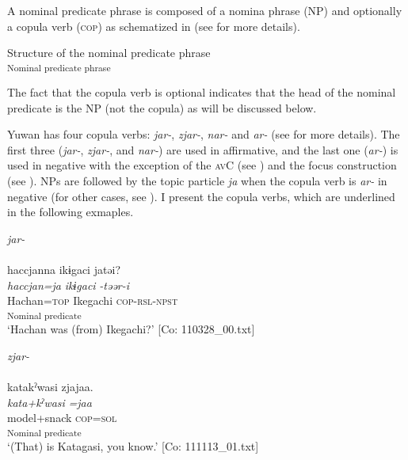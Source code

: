 A nominal predicate phrase is composed of a nomina phrase (NP) and optionally a copula verb (\textsc{cop}) as schematized in  (see  for more details).

\ea  Structure of the nominal predicate phrase \label{ex:4.12}\\\textsubscript{Nominal predicate phrase}
\z

The fact that the copula verb is optional indicates that the head of the nominal predicate is the NP (not the copula) as will be discussed below.

Yuwan has four copula verbs: \textit{jar-}, \textit{zjar-}, \textit{nar-} and \textit{ar-} (see  for more details). The first three (\textit{jar-}, \textit{zjar-}, and \textit{nar-}) are used in affirmative, and the last one (\textit{ar-}) is used in negative with the exception of the \textsc{av}C (see ) and the focus construction (see ). NPs are followed by the topic particle \textit{ja} when the copula verb is \textit{ar-} in negative (for other cases, see ). I present the copula verbs, which are underlined in the following exmaples.

\ea \label{ex:4.13}
\ea   \textit{jar-} \label{ex:4.13a}\\\\
    \gllll haccjanna  ikɨgaci  jatəi?\\
      \textit{haccjan=ja}  \textit{ikɨgaci}  \textit{-təər-i}\\
      Hachan=\textsc{top}  Ikegachi  \textsc{cop}-\textsc{rsl}-\textsc{npst}\\
        [NP  Copular verb]\textsubscript{Nominal predicate}\\
    \glt       ‘Hachan was (from) Ikegachi?’      [Co: 110328\_00.txt]

\ex \textit{zjar-}\\\\
\gllll    katakˀwasi  zjajaa.\\
      \textit{kata+kˀwasi}  \textit{=jaa}\\
      model+snack  \textsc{cop}=\textsc{sol}\\
      [NP  Copular verb]\textsubscript{Nominal predicate}\\
      \glt       ‘(That) is Katagasi, you know.’ [Co: 111113\_01.txt]

